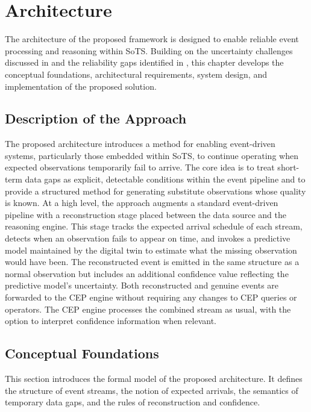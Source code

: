 \chapter{Architecture}\label{ch:architecture}

The architecture of the proposed framework is designed to enable reliable event processing and reasoning within SoTS. Building on the uncertainty challenges discussed in  and the reliability gaps identified in , this chapter develops the conceptual foundations, architectural requirements, system design, and implementation of the proposed solution.


\section{Description of the Approach} \label{sec:approach}
The proposed architecture introduces a method for enabling event-driven systems, particularly those embedded within SoTS, to continue operating when expected observations temporarily fail to arrive. The core idea is to treat short-term data gaps as explicit, detectable conditions within the event pipeline and to provide a structured method for generating substitute observations whose quality is known. At a high level, the approach augments a standard event-driven pipeline with a reconstruction stage placed between the data source and the reasoning engine. This stage tracks the expected arrival schedule of each stream, detects when an observation fails to appear on time, and invokes a predictive model maintained by the digital twin to estimate what the missing observation would have been. The reconstructed event is emitted in the same structure as a normal observation but includes an additional confidence value reflecting the predictive model’s uncertainty. Both reconstructed and genuine events are forwarded to the CEP engine without requiring any changes to CEP queries or operators. The CEP engine processes the combined stream as usual, with the option to interpret confidence information when relevant.


\section{Conceptual Foundations}
\label{sec:architecture-conceptual-foundations}

This section introduces the formal model of  the proposed architecture. It defines the structure of event streams, the notion of expected arrivals, the semantics of temporary data gaps, and the rules of reconstruction and confidence.


